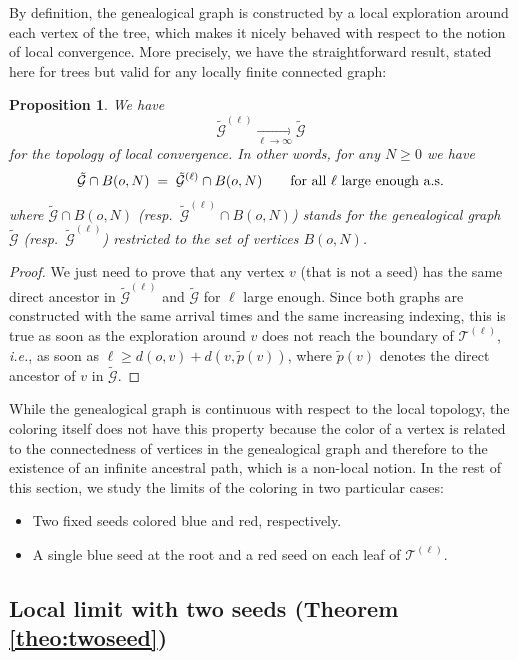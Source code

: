 \documentclass[french]{article}
\newtheorem{prop}[theorem]{Proposition}
\newcommand{\T}{\mathcal{T}}
\renewcommand{\1}{\mathds{1}}
\begin{document}
By definition, the genealogical graph is constructed by a local exploration around each vertex of the tree, which makes it nicely behaved with respect to the notion of local convergence. More precisely, we have the straightforward result, stated here for trees but valid for any locally finite connected graph:

\begin{prop} We have
$$
\tilde{\mathcal{G}}^{(\ell)} \underset{\ell\to\infty}{\longrightarrow}  \tilde{\mathcal{G}}
$$
for the topology of local convergence. In other words, for any $N\geq 0$ we have
$$
\tilde{\mathcal{G}} \cap B(o,N) \; = \; \tilde{\mathcal{G}}^{(\ell)} \cap B(o,N) \qquad\hbox{for all $\ell$ large enough a.s.}
$$
where $\tilde{\mathcal{G}} \cap B(o,N)$ (resp.\ $\tilde{\mathcal{G}}^{(\ell)} \cap B(o,N)$) stands for the genealogical graph $\tilde{\mathcal{G}}$ (resp.\ $\tilde{\mathcal{G}}^{(\ell)}$) restricted to the set of vertices $B(o,N)$.
\end{prop}

\begin{proof}
We just need to prove that any vertex $v$ (that is not a seed) has the same direct ancestor in $\tilde{\mathcal{G}}^{(\ell)}$ and $\tilde{\mathcal{G}}$ for $\ell$ large enough. Since both graphs are constructed with the same arrival times and the same increasing indexing, this is true as soon as the exploration around $v$ does not reach the boundary of $\T^{(\ell)}$, \emph{i.e.}, as soon as $\ell \geq d(o, v) + d(v, \tilde{p}(v))$, where $\tilde{p}(v)$ denotes the direct ancestor of $v$ in $\tilde{\mathcal{G}}$. 
\end{proof}

While the genealogical graph is continuous with respect to the local topology, the coloring itself does not have this property because the color of a vertex is related to the connectedness of vertices in the genealogical graph and therefore to the existence of an infinite ancestral path, which is a non-local notion. In the rest of this section, we study the limits of the coloring in two particular cases: 
\begin{itemize}
\item[(a)] Two fixed seeds colored blue and red, respectively. 
\item[(b)] A single blue seed at the root and a red seed on each leaf of $\T^{(\ell)}$. 
\end{itemize}





\subsection{Local limit with two seeds (Theorem \ref{theo:twoseed})}
\end{document}
